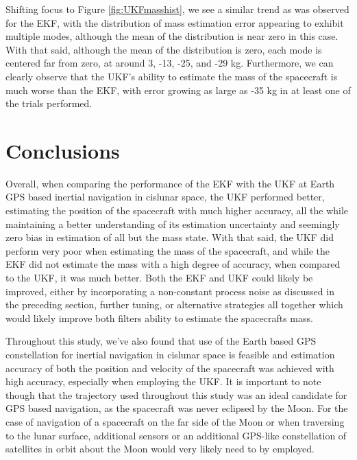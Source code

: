 \documentclass[letterpaper, paper,11pt]{AAS}		%
\begin{document}
Shifting focus to Figure \ref{fig:UKFmasshist}, we see a similar trend as was observed for the EKF, with the distribution of mass estimation error appearing to exhibit multiple modes, although the mean of the distribution is near zero in this case. With that said, although the mean of the distribution is zero, each mode is centered far from zero, at around 3, -13, -25, and -29 kg. Furthermore, we can clearly observe that the UKF's ability to estimate the mass of the spacecraft is much worse than the EKF, with error growing as large as -35 kg in at least one of the trials performed. 

\section{Conclusions}
Overall, when comparing the performance of the EKF with the UKF at Earth GPS based inertial navigation in cislunar space, the UKF performed better, estimating the position of the spacecraft with much higher accuracy, all the while maintaining a better understanding of its estimation uncertainty and seemingly zero bias in estimation of all but the mass state. With that said, the UKF did perform very poor when estimating the mass of the spacecraft, and while the EKF did not estimate the mass with a high degree of accuracy, when compared to the UKF, it was much better. Both the EKF and UKF could likely be improved, either by incorporating a non-constant process noise as discussed in the preceding section, further tuning, or alternative strategies all together which would likely improve both filters ability to estimate the spacecrafts mass. 

Throughout this study, we've also found that use of the Earth based GPS constellation for inertial navigation in cislunar space is feasible and estimation accuracy of both the position and velocity of the spacecraft was achieved with high accuracy, especially when employing the UKF. It is important to note though that the trajectory used throughout this study was an ideal candidate for GPS based navigation, as the spacecraft was never eclipsed by the Moon. For the case of navigation of a spacecraft on the far side of the Moon or when traversing to the lunar surface, additional sensors or an additional GPS-like constellation of satellites in orbit about the Moon would very likely need to by employed.

\end{document}
